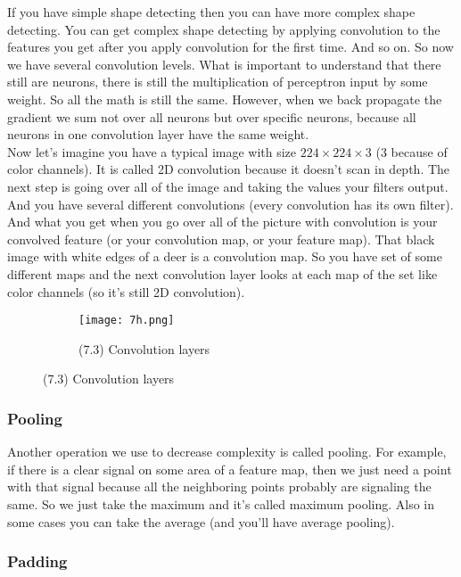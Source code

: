 If you have simple shape detecting then you can have more complex shape detecting. You can get complex shape detecting by applying convolution to the features you get after you apply convolution for the first time. And so on. So now we have several convolution levels. What is important to understand that there still are neurons, there is still the multiplication of perceptron input by some weight. So all the math is still the same. However, when we back propagate the gradient we sum not over all neurons but over specific neurons, because all neurons in one convolution layer have the same weight.\\
Now let's imagine you have a typical image with size $224\times224\times3$ (3 because of color channels). It is called 2D convolution because it doesn't scan in depth. The next step is going over all of the image and taking the values your filters output. And you have several different convolutions (every convolution has its own filter). And what you get when you go over all of the picture with convolution is your convolved feature (or your convolution map, or your feature map). That black image with white edges of a deer is a convolution map. So you have set of some different maps and the next convolution layer looks at each map of the set like color channels (so it's still 2D convolution).\\
\begin{figure}[h]
  \centering
  \begin{subfigure}[l]{0.6\linewidth}
    \texttt{[image: 7h.png]}
    \caption*{(7.3) Convolution layers}
  \end{subfigure}
\end{figure}

\vspace{-0.5cm}
\subsubsection*{Pooling}

Another operation we use to decrease complexity is called pooling. For example, if there is a clear signal on some area of a feature map, then we just need a point with that signal because all the neighboring points probably are signaling the same. So we just take the maximum and it's called maximum pooling. Also in some cases you can take the average (and you'll have average pooling).

\subsubsection*{Padding}

